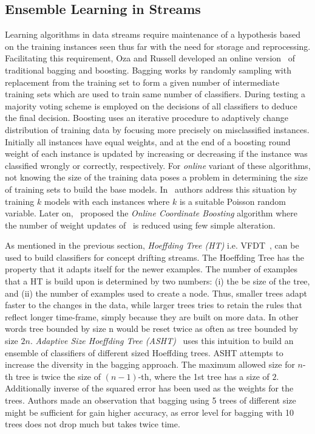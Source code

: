 \subsection{Ensemble Learning in Streams}
Learning algorithms in data streams require maintenance of a hypothesis based on the training instances seen thus far with the need for storage and reprocessing. Facilitating this requirement, Oza and Russell developed an online version~\cite{oza01:obagboost, oza01:thesis} of traditional bagging and boosting. Bagging works by randomly sampling with replacement from the training set to form a given number of intermediate training sets which are used to train same number of classifiers. During testing a majority voting scheme is employed on the decisions of all classifiers to deduce the final decision. Boosting uses an iterative procedure to adaptively change distribution of training data by focusing more precisely on misclassified instances. Initially all instances have equal weights, and at the end of a boosting round weight of each instance is updated by increasing or decreasing if the instance was classified wrongly or correctly, respectively. For \textit{online} variant of these algorithms, not knowing the size of the training data poses a problem in determining the size of training sets to build the base models. In~\cite{oza01:obagboost} authors address this situation by training $k$ models with each instances where $k$ is a suitable Poisson random variable. Later on,~\cite{pelossof08:boosting} proposed the \textit{Online Coordinate Boosting} algorithm where the number of weight updates of~\cite{oza01:obagboost} is reduced using few simple alteration.


As mentioned in the previous section, \textit{Hoeffding Tree (HT)} i.e. VFDT~\cite{domingos00:vfdt}, can be used to build classifiers for concept drifting streams. The Hoeffding Tree has the property that it adapts itself for the newer examples. The number of examples that a HT is build upon is determined by two numbers: (i) the be size of the tree, and (ii) the number of examples used to create a node. Thus, smaller trees adapt faster to the changes in the data, while larger trees tries to retain the rules that reflect longer time-frame, simply because they are built on more data. In other words tree bounded by size n would be reset twice as often as tree bounded by size $2n$. \textit{Adaptive Size Hoeffding Tree (ASHT)}~\cite{bifet09:asht} uses this intuition to build an ensemble of classifiers of different sized Hoeffding trees. ASHT attempts to increase the diversity in the bagging approach. The maximum allowed size for $n$-th tree is twice the size of $(n-1)$-th, where the 1st tree has a size of $2$. Additionally inverse of the squared error has been used as the weights for the trees. Authors made an observation that bagging using 5 trees of different size might be sufficient for gain higher accuracy, as error level for bagging with 10 trees does not drop much but takes twice time.

